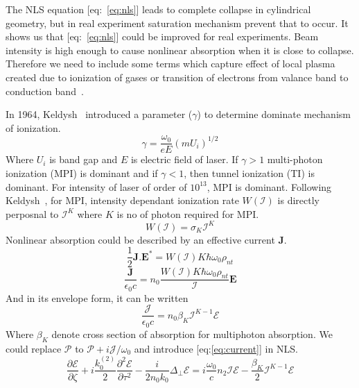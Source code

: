 \documentclass[../main.tex]{subfiles}
\begin{document}
The NLS equation [eq:~\ref{eq:nls}] leads to complete collapse in cylindrical
geometry, but in real experiment saturation mechanism prevent that to occur.
It shows us that [eq:~\ref{eq:nls}] could be improved for real experiments.
Beam intensity is high enough to cause nonlinear absorption when
it is close to collapse. Therefore we need to include some terms which capture
effect of local plasma created due to ionization of gases or transition of
electrons from valance band to conduction band~\cite{gopal_systematic_2007}.

In 1964, Keldysh~\cite{keldysh_ionization_1964} introduced a parameter
($\gamma$) to determine dominate mechanism of ionization.
\begin{equation} \label{eq:gamma}
	\gamma = \frac{\omega_0}{eE} (mU_i)^{1/2}
\end{equation}
Where $U_i$ is band gap and $E$ is electric field of laser.
If $\gamma > 1$ multi-photon ionization (MPI) is dominant and if $\gamma < 1$,
then tunnel ionization (TI) is dominant.
For intensity of laser of order of $10^{13}$, MPI is dominant.
Following Keldysh~\cite{keldysh_ionization_1964}, for MPI, intensity dependant
ionization rate $W(\mathcal{I})$ is directly perposnal to $\mathcal{I}^K$ where
$K$ is no of photon required for MPI.
\begin{equation} \label{eq:MPI_Rate}
	W(\mathcal{I}) = \sigma_K \mathcal{I}^K
\end{equation}
Nonlinear absorption could be described by an effective current $\textbf{J}$.
\begin{equation} \label{eq:eff_current}
	\frac{1}{2} \textbf{J}.\textbf{E}^* = W(\mathcal{I}) K \hbar \omega_0 \rho_{nt}
\end{equation}
\begin{equation}
	\frac{\textbf{J}}{\epsilon_0 c} = n_0 \frac{W(\mathcal{I}) K \hbar
	\omega_0 \rho_{nt}}{\mathcal{I}} \textbf{E}
\end{equation}
And in its envelope form, it can be written
\begin{equation} \label{eq:current}
	\frac{\mathcal{J}}{\epsilon_0 c} = n_0 \beta_K \mathcal{I}^{K-1}\mathcal{E}
\end{equation}
Where $\beta_K$ denote cross section of absorption for multiphoton absorption.
We could replace $\mathcal{P}$ to $\mathcal{P} +i{\mathcal{J}}/{\omega_0}$ and
introduce [eq:\ref{eq:current}] in NLS.
\begin{equation} \label{eq:nls_abs}
	\frac{\partial \mathcal{E}}{\partial \zeta}
		+ i\frac{k_0^{(2)}}{2} \frac{\partial^2 \mathcal{E}}{\partial
		\tau^2} - \frac{i}{2n_0k_0}\Delta_\perp \mathcal{E}
		= i\frac{\omega_0}{c}n_2\mathcal{I} \mathcal{E}
		- \frac{\beta_K}{2}\mathcal{I}^{K-1} \mathcal{E}
\end{equation}
\end{document}
